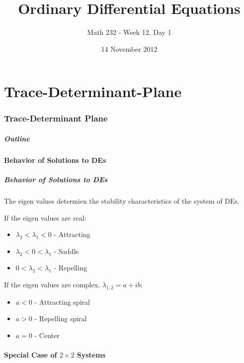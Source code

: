 \part{Trace-Determinant-Plane}
\section{Trace-Determinant Plane}


\title{Ordinary Differential Equations}
\subtitle{Math 232 - Week 12, Day 1}
\date{14 November 2012}

\begin{frame}
  \titlepage
\end{frame}

\begin{frame}
  \frametitle{Outline}
\end{frame}


\subsection{Behavior of Solutions to DEs}


\begin{frame}
  \frametitle{Behavior of Solutions to DEs}

  The eigen values determien the stability characteristics of the
  system of DEs.

  If the eigen values are real:
  \begin{itemize}
  \item $\lambda_2 < \lambda_1 < 0$ - Attracting
  \item $\lambda_2 < 0 < \lambda_1$ - Saddle
  \item $0 < \lambda_2 < \lambda_1$ - Repelling
  \end{itemize}

  If the eigen values are complex, $\lambda_{1,2}=a+ib$:
  \begin{itemize}
  \item $a<0$ - Attracting spiral
  \item $a>0$ - Repelling spiral
  \item $a=0$ - Center
  \end{itemize}

\end{frame}

\subsection{Special Case of $2\times 2$ Systems}

